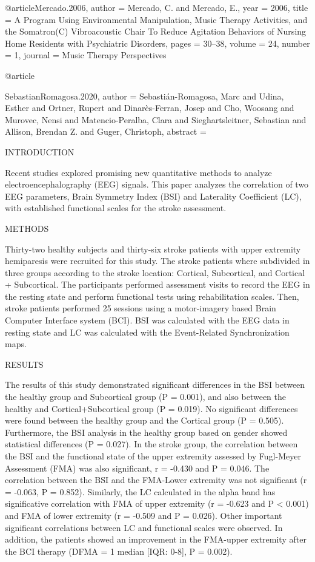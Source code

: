 @article{Mercado.2006,
 author = {Mercado, C. and Mercado, E.},
 year = {2006},
 title = {{A Program Using Environmental Manipulation, Music Therapy Activities, and the Somatron(C) Vibroacoustic Chair To Reduce Agitation Behaviors of Nursing Home Residents with Psychiatric Disorders}},
 pages = {30--38},
 volume = {24},
 number = {1},
 journal = {{Music Therapy Perspectives}}
}


@article{SebastianRomagosa.2020,
 author = {Sebasti{\'a}n-Romagosa, Marc and Udina, Esther and Ortner, Rupert and Dinar{\`e}s-Ferran, Josep and Cho, Woosang and Murovec, Nensi and Matencio-Peralba, Clara and Sieghartsleitner, Sebastian and Allison, Brendan Z. and Guger, Christoph},
 abstract = {INTRODUCTION

Recent studies explored promising new quantitative methods to analyze electroencephalography (EEG) signals. This paper analyzes the correlation of two EEG parameters, Brain Symmetry Index (BSI) and Laterality Coefficient (LC), with established functional scales for the stroke assessment.

METHODS

Thirty-two healthy subjects and thirty-six stroke patients with upper extremity hemiparesis were recruited for this study. The stroke patients where subdivided in three groups according to the stroke location: Cortical, Subcortical, and Cortical + Subcortical. The participants performed assessment visits to record the EEG in the resting state and perform functional tests using rehabilitation scales. Then, stroke patients performed 25 sessions using a motor-imagery based Brain Computer Interface system (BCI). BSI was calculated with the EEG data in resting state and LC was calculated with the Event-Related Synchronization maps.

RESULTS

The results of this study demonstrated significant differences in the BSI between the healthy group and Subcortical group (P = 0.001), and also between the healthy and Cortical+Subcortical group (P = 0.019). No significant differences were found between the healthy group and the Cortical group (P = 0.505). Furthermore, the BSI analysis in the healthy group based on gender showed statistical differences (P = 0.027). In the stroke group, the correlation between the BSI and the functional state of the upper extremity assessed by Fugl-Meyer Assessment (FMA) was also significant, \textgreek{r} = -0.430 and P = 0.046. The correlation between the BSI and the FMA-Lower extremity was not significant (\textgreek{r} = -0.063, P = 0.852). Similarly, the LC calculated in the alpha band has significative correlation with FMA of upper extremity (\textgreek{r} = -0.623 and P {\textless} 0.001) and FMA of lower extremity (\textgreek{r} = -0.509 and P = 0.026). Other important significant correlations between LC and functional scales were observed. In addition, the patients showed an improvement in the FMA-upper extremity after the BCI therapy (\textgreek{D}FMA = 1 median [IQR: 0-8], P = 0.002).

}}
